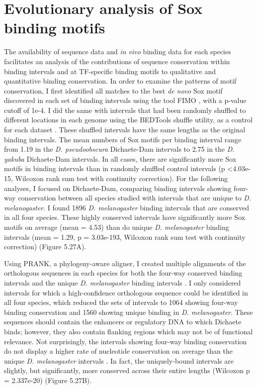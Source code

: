 \section{Evolutionary analysis of Sox binding motifs}
The availability of sequence data and \emph{in vivo} binding data for each species facilitates an analysis of the contributions of sequence conservation within binding intervals and at TF-specific binding motifs to qualitative and quantitative binding conservation. In order to examine the patterns of motif conservation, I first identified all matches to the best \emph{de novo} Sox motif discovered in each set of binding intervals using the tool FIMO \citep{grant_fimo:_2011}, with a p-value cutoff of 1e-4. I did the same with intervals that had been randomly shuffled to different locations in each genome using the BEDTools shuffle utility, as a control for each dataset \citep{quinlan_bedtools:_2010}. These shuffled intervals have the same lengths as the original binding intervals. The mean numbers of Sox motifs per binding interval range from 1.19 in the \emph{D. pseudoobscura} Dichaete-Dam intervals to 2.75 in the \emph{D. yakuba} Dichaete-Dam intervals. In all cases, there are significantly more Sox motifs in binding intervals than in randomly shuffled control intervals (p \textless 4.03e-15, Wilcoxon rank sum test with continuity correction). For the following analyses, I focused on Dichaete-Dam, comparing binding intervals showing four-way conservation between all species studied with intervals that are unique to \emph{D. melanogaster}. I found 1896 \emph{D. melanogaster} binding intervals that are conserved in all four species. These highly conserved intervals have significantly more Sox motifs on average (mean = 4.53) than do unique \emph{D. melanogaster} binding intervals (mean = 1.29, p = 3.03e-193, Wilcoxon rank sum test with continuity correction) (Figure 5.27A).

Using PRANK, a phylogeny-aware aligner, I created multiple alignments of the orthologous sequences in each species for both the four-way conserved binding intervals and the unique \emph{D. melanogaster} binding intervals \citep{loytynoja_algorithm_2005,loytynoja_phylogeny-aware_2008}. I only considered intervals for which a high-confidence orthologous sequence could be identified in all four species, which reduced the sets of intervals to 1064 showing four-way binding conservation and 1560 showing unique binding in \emph{D. melanogaster}. These sequences should contain the enhancers or regulatory DNA to which Dichaete binds; however, they also contain flanking regions which may not be of functional relevance. Not surprisingly, the intervals showing four-way binding conservation do not display a higher rate of nucleotide conservation on average than the unique \emph{D. melanogaster} intervals \citep{he_high_2011}. In fact, the uniquely-bound intervals are slightly, but significantly, more conserved across their entire lengths (Wilcoxon p = 2.337e-20) (Figure 5.27B).

